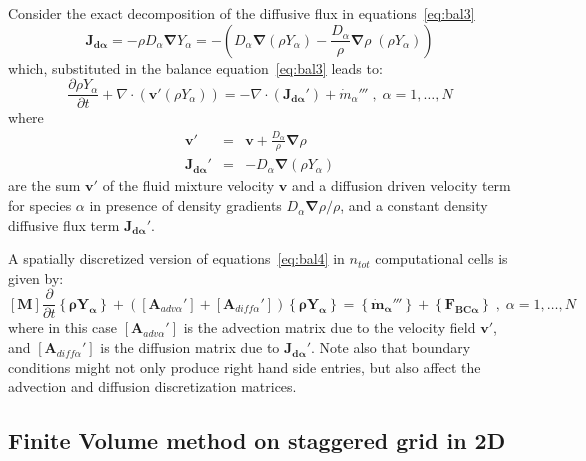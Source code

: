 Consider the exact decomposition of the diffusive flux in equations~\eqref{eq:bal3}
%
\begin{equation}
   \mathbf{J_{d \alpha}} = - \rho D_\alpha \boldsymbol{\nabla} Y_\alpha =  - \left( D_\alpha \boldsymbol{\nabla} ( \rho Y_\alpha)
   - \frac{D_\alpha}{\rho} \boldsymbol{\nabla} \rho \; ( \rho Y_\alpha) \right) \label{eq:expdfl2}
\end{equation}
%
which, substituted in the balance equation~\eqref{eq:bal3} leads to:
%
\begin{equation}
 \frac{\partial \rho Y_\alpha}{ \partial t} + \nabla \cdot \left(  \mathbf{v}' (\rho Y_\alpha)   \right) = - \nabla \cdot \left(  \mathbf{J_{d \alpha}'} \right) + \dot{m}_\alpha''' \; , \; \alpha=1,\dots,N \label{eq:bal4}
\end{equation}
%
where
%
\begin{eqnarray}
  \mathbf{v}' &=& \mathbf{v} + \frac{D_\alpha}{\rho} \boldsymbol{\nabla} \rho  \label{eq:vprime} \\
   \mathbf{J_{d \alpha}'} &=& -D_\alpha \boldsymbol{\nabla}  (\rho Y_\alpha )  \label{eq:jdaprime}
\end{eqnarray}
%
are the sum $\mathbf{v}'$ of the fluid mixture velocity $\mathbf{v}$ and a diffusion driven velocity term for species $\alpha$ in presence of density gradients $D_\alpha \boldsymbol{\nabla} \rho / \rho $, and a constant density diffusive flux term $\mathbf{J_{d \alpha}'}$.

A spatially discretized version of equations~\eqref{eq:bal4} in $n_{tot}$ computational cells is given by:
%
\begin{equation}
\left[ \mathbf{M} \right] \frac{\partial}{\partial t} \left\{ \mathbf{\rho Y_\alpha} \right\} + \left( \left[ \mathbf{A}_{adv \alpha}'  \right] +\left[ \mathbf{A}_{diff \alpha}' \right] \right) \left\{ \mathbf{\rho Y_\alpha} \right\}   =  \left\{  \mathbf{\dot{m}_\alpha'''} \right\} +  \left\{ \mathbf{F_{BC \alpha}} \right\} \; , \; \alpha=1,\dots,N \label{eq:discbal4}
\end{equation}
%
where in this case $ \left[ \mathbf{A}_{adv \alpha}'  \right]$ is the advection matrix due to the velocity field $\mathbf{v}'$, and  $\left[ \mathbf{A}_{diff \alpha}' \right]$ is the diffusion matrix due to $ \mathbf{J_{d \alpha}'} $. Note also that boundary conditions might not only produce right hand side entries, but also affect the advection and diffusion discretization matrices.



\subsection{Finite Volume method on staggered grid in 2D}

